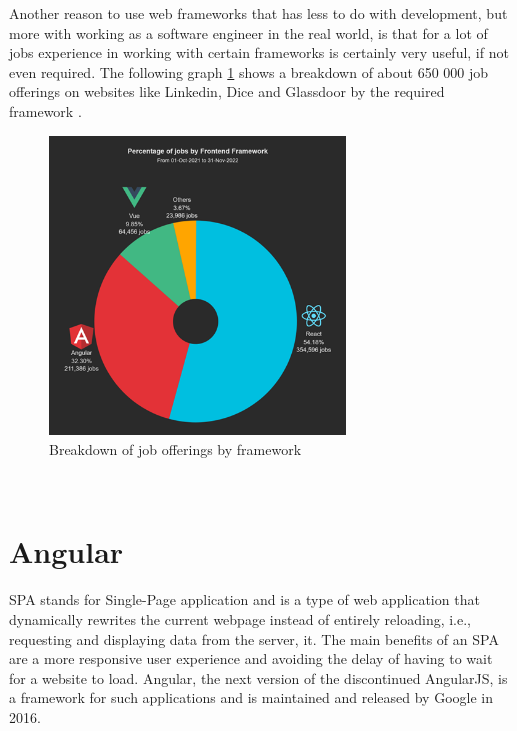 Another reason to use web frameworks that has less to do with development, but more with working as a software engineer in 
the real world, is that for a lot of jobs experience in working with certain frameworks is certainly very useful, if not 
even required. The following graph \ref{fig:WebframeworkJobs} shows a breakdown of about 650 000 job offerings on websites like Linkedin, 
Dice and Glassdoor by the required framework \cite{WebframeworkJobs}.
\\
\begin{figure}[htb]
  \centering
  \includegraphics[width=0.7\textwidth]{pics/piechartwebframework.png}
  \caption{Breakdown of job offerings by framework}
  \label{fig:WebframeworkJobs}
\end{figure}
\\
\section{Angular}
SPA stands for Single-Page application and is a type of web application that dynamically rewrites the 
current webpage instead of entirely reloading, i.e., requesting and displaying data from the server, it. 
The main benefits of an SPA are a more responsive user experience and avoiding the delay of having to wait 
for a website to load. Angular, the next version of the discontinued AngularJS, is a framework for such 
applications and is maintained and released by Google in 2016. \cite{RoadToReact}

